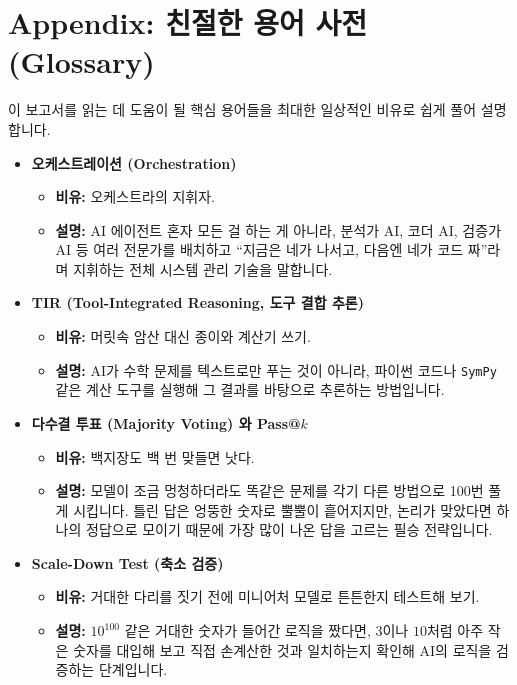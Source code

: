 \documentclass[11pt,a4paper]{article}
\begin{document}
\section{Appendix: 친절한 용어 사전 (Glossary)}
이 보고서를 읽는 데 도움이 될 핵심 용어들을 최대한 일상적인 비유로 쉽게 풀어 설명합니다.

\begin{itemize}
    \item \textbf{오케스트레이션 (Orchestration)}
    \begin{itemize}
        \item \textbf{비유:} 오케스트라의 지휘자.
        \item \textbf{설명:} AI 에이전트 혼자 모든 걸 하는 게 아니라, 분석가 AI, 코더 AI, 검증가 AI 등 여러 전문가를 배치하고 ``지금은 네가 나서고, 다음엔 네가 코드 짜''라며 지휘하는 전체 시스템 관리 기술을 말합니다.
    \end{itemize}
    \item \textbf{TIR (Tool-Integrated Reasoning, 도구 결합 추론)}
    \begin{itemize}
        \item \textbf{비유:} 머릿속 암산 대신 종이와 계산기 쓰기.
        \item \textbf{설명:} AI가 수학 문제를 텍스트로만 푸는 것이 아니라, 파이썬 코드나 \texttt{SymPy} 같은 계산 도구를 실행해 그 결과를 바탕으로 추론하는 방법입니다.
    \end{itemize}
    \item \textbf{다수결 투표 (Majority Voting) 와 Pass@$k$}
    \begin{itemize}
        \item \textbf{비유:} 백지장도 백 번 맞들면 낫다.
        \item \textbf{설명:} 모델이 조금 멍청하더라도 똑같은 문제를 각기 다른 방법으로 100번 풀게 시킵니다. 틀린 답은 엉뚱한 숫자로 뿔뿔이 흩어지지만, 논리가 맞았다면 하나의 정답으로 모이기 때문에 가장 많이 나온 답을 고르는 필승 전략입니다.
    \end{itemize}
    \item \textbf{Scale-Down Test (축소 검증)}
    \begin{itemize}
        \item \textbf{비유:} 거대한 다리를 짓기 전에 미니어처 모델로 튼튼한지 테스트해 보기.
        \item \textbf{설명:} $10^{100}$ 같은 거대한 숫자가 들어간 로직을 짰다면, $3$이나 $10$처럼 아주 작은 숫자를 대입해 보고 직접 손계산한 것과 일치하는지 확인해 AI의 로직을 검증하는 단계입니다.

\end{itemize}
\end{itemize}
\end{document}
